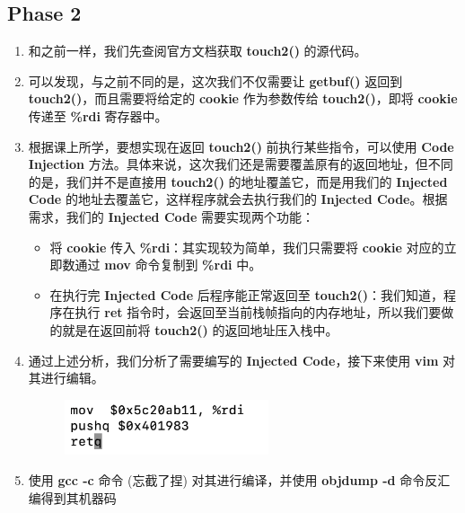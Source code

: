     \subsection{Phase 2}
        \begin{enumerate}
            \item 和之前一样，我们先查阅官方文档获取 \textbf{touch2()} 的源代码。
                
            \item 可以发现，与之前不同的是，这次我们不仅需要让 \textbf{getbuf()} 返回到 \textbf{touch2()}，而且需要将给定的 \textbf{cookie} 作为参数传给 \textbf{touch2()}，即将 \textbf{cookie} 传递至 \textbf{\%rdi} 寄存器中。
            \item 根据课上所学，要想实现在返回 \textbf{touch2()} 前执行某些指令，可以使用 \textbf{Code Injection} 方法。具体来说，这次我们还是需要覆盖原有的返回地址，但不同的是，我们并不是直接用 \textbf{touch2()} 的地址覆盖它，而是用我们的 \textbf{Injected Code} 的地址去覆盖它，这样程序就会去执行我们的 \textbf{Injected Code}。根据需求，我们的 \textbf{Injected Code} 需要实现两个功能：
                \begin{itemize}
                    \item 将 \textbf{cookie} 传入 \textbf{\%rdi}：其实现较为简单，我们只需要将 \textbf{cookie} 对应的立即数通过 \textbf{mov} 命令复制到 \textbf{\%rdi} 中。
                    \item 在执行完 \textbf{Injected Code} 后程序能正常返回至 \textbf{touch2()}：我们知道，程序在执行 \textbf{ret} 指令时，会返回至当前栈帧指向的内存地址，所以我们要做的就是在返回前将 \textbf{touch2()} 的返回地址压入栈中。
                \end{itemize}
            \newpage
            \item 通过上述分析，我们分析了需要编写的 \textbf{Injected Code}，接下来使用 \textbf{vim} 对其进行编辑。
                \begin{figure}[htbp]
                    \hspace*{1.5cm}
                    \includegraphics*[width = 6cm]{s2_0.png}
                \end{figure}
            \item 使用 \textbf{gcc -c} 命令 (忘截了捏) 对其进行编译，并使用 \textbf{objdump -d} 命令反汇编得到其机器码
                \begin{figure}[htbp]

\end{figure}
\end{enumerate}
